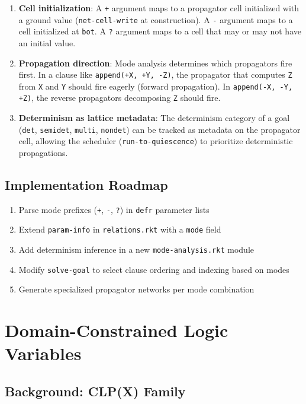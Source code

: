 \documentclass[11pt]{article}
\begin{document}
\begin{enumerate}
\item \textbf{Cell initialization}: A \texttt{+} argument maps to a propagator cell initialized
with a ground value (\texttt{net-cell-write} at construction). A \texttt{-} argument maps
to a cell initialized at \texttt{bot}. A \texttt{?} argument maps to a cell that may or
may not have an initial value.

\item \textbf{Propagation direction}: Mode analysis determines which propagators fire
first. In a clause like \texttt{append(+X, +Y, -Z)}, the propagator that computes
\texttt{Z} from \texttt{X} and \texttt{Y} should fire eagerly (forward propagation). In
\texttt{append(-X, -Y, +Z)}, the reverse propagators decomposing \texttt{Z} should fire.

\item \textbf{Determinism as lattice metadata}: The determinism category of a goal
(\texttt{det}, \texttt{semidet}, \texttt{multi}, \texttt{nondet}) can be tracked as metadata on the
propagator cell, allowing the scheduler (\texttt{run-to-quiescence}) to prioritize
deterministic propagations.
\end{enumerate}
\subsection{Implementation Roadmap}
\label{sec:org1e92642}

\begin{enumerate}
\item Parse mode prefixes (\texttt{+}, \texttt{-}, \texttt{?}) in \texttt{defr} parameter lists
\item Extend \texttt{param-info} in \texttt{relations.rkt} with a \texttt{mode} field
\item Add determinism inference in a new \texttt{mode-analysis.rkt} module
\item Modify \texttt{solve-goal} to select clause ordering and indexing based on modes
\item Generate specialized propagator networks per mode combination
\end{enumerate}
\section{Domain-Constrained Logic Variables}
\label{sec:orgb85bb10}

\subsection{Background: CLP(X) Family}
\label{sec:org5af9141}
\end{document}
